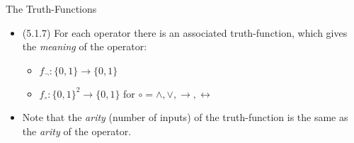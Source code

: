 \documentclass[../slides.tex]{subfiles}
\begin{document}
\begin{frame}{The Truth-Functions}
	
	\begin{itemize}
	
		\item (5.1.7) For each operator there is an associated truth-function, which gives the \emph{meaning} of the operator:
		
		\begin{itemize}
		
			\item $f_\neg:\{0,1\}\to\{0,1\}$
		
			 \item $f_\circ:\{0,1\}^2\to\{0,1\}$ for $\circ=\land,\lor,\to,\leftrightarrow$
		
		\end{itemize}
		
		\item Note that the \emph{arity} (number of inputs) of the truth-function is the same as the \emph{arity} of the operator.

	\end{itemize}

\end{frame}

\end{document}
